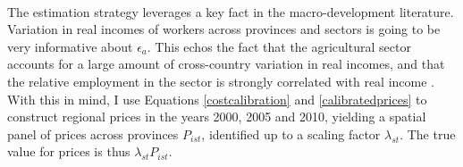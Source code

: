 \documentclass[]{article}
\theoremstyle{plain}
\begin{document}
\paragraph*{}
The estimation strategy leverages a key fact in the macro-development literature. Variation in real incomes of workers across provinces and sectors is going to be very informative about $\epsilon_{a}$. This echos the fact that the agricultural sector accounts for a large amount of cross-country variation in real incomes, and that the relative employment in the sector is strongly correlated with real income \citep*{restyangzhu}. With this in mind, I use Equations \eqref{costcalibration} and \eqref{calibratedprices} to construct regional prices in the years 2000, 2005 and 2010, yielding a spatial panel of prices across provinces $P_{is t}$, identified up to a scaling factor $\lambda_{st}$. The true value for prices is thus $\lambda_{st}P_{ist}$. 
\end{document}

